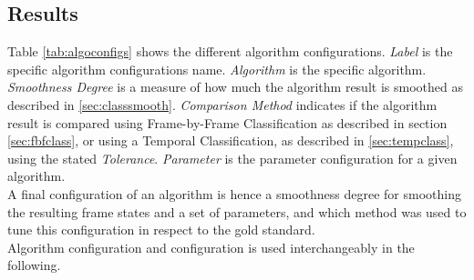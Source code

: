 \subsection{Results}
Table \ref{tab:algoconfigs} shows the different algorithm configurations. \textit{Label} is the specific algorithm configurations name. \textit{Algorithm} is the specific algorithm. \textit{Smoothness Degree} is a measure of how much the algorithm result is smoothed as described in \ref{sec:classsmooth}. \textit{Comparison Method} indicates if the algorithm result is compared using Frame-by-Frame Classification as described in section \ref{sec:fbfclass}, or using a Temporal Classification, as described in \ref{sec:tempclass}, using the stated \textit{Tolerance}. \textit{Parameter} is the parameter configuration for a given algorithm.\\
A final configuration of an algorithm is hence a smoothness degree for smoothing the resulting frame states and a set of parameters, and which method was used to tune this configuration in respect to the gold standard.\\
Algorithm configuration and configuration is used interchangeably in the following.
%
